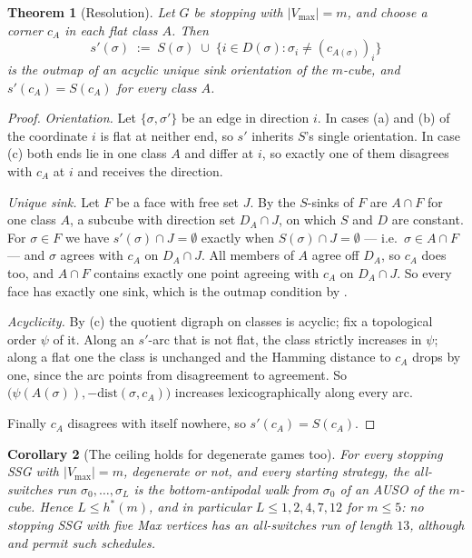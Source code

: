\documentclass[11pt]{article}
\theoremstyle{plain}
\newtheorem{theorem}{Theorem}[section]
\newtheorem{corollary}[theorem]{Corollary}
\theoremstyle{definition}
\newcommand{\Vmax}{V_{\max}}
\begin{document}
\begin{theorem}[Resolution]\label{thm:flat-resolution}
Let $G$ be stopping with $|\Vmax|=m$, and choose a corner $c_A$ in each flat
class $A$. Then
\[
  s'(\sigma)\;:=\;S(\sigma)\;\cup\;\bigl\{i\in D(\sigma):\sigma_i\ne(c_{A(\sigma)})_i\bigr\}
\]
is the outmap of an acyclic unique sink orientation of the $m$-cube, and
$s'(c_A)=S(c_A)$ for every class $A$.
\end{theorem}

\begin{proof}
\emph{Orientation.} Let $\{\sigma,\sigma'\}$ be an edge in direction $i$. In
cases (a) and (b) of  the coordinate $i$ is flat at
neither end, so $s'$ inherits $S$'s single orientation. In case (c) both ends
lie in one class $A$ and differ at $i$, so exactly one of them disagrees with
$c_A$ at $i$ and receives the direction.

\emph{Unique sink.} Let $F$ be a face with free set $J$. By
 the $S$-sinks of $F$ are $A\cap F$ for one class $A$, a
subcube with direction set $D_A\cap J$, on which $S$ and $D$ are constant.
For $\sigma\in F$ we have $s'(\sigma)\cap J=\emptyset$ exactly when
$S(\sigma)\cap J=\emptyset$ --- i.e.\ $\sigma\in A\cap F$ --- and $\sigma$
agrees with $c_A$ on $D_A\cap J$. All members of $A$ agree off $D_A$, so
$c_A$ does too, and $A\cap F$ contains exactly one point agreeing with $c_A$
on $D_A\cap J$. So every face has exactly one sink, which is the outmap
condition by .

\emph{Acyclicity.} By (c) the quotient digraph on classes
is acyclic; fix a topological order $\psi$ of it. Along an $s'$-arc that is
not flat, the class strictly increases in $\psi$; along a flat one the class
is unchanged and the Hamming distance to $c_A$ drops by one, since the arc
points from disagreement to agreement. So
$\bigl(\psi(A(\sigma)),-\mathrm{dist}(\sigma,c_A)\bigr)$ increases
lexicographically along every arc.

Finally $c_A$ disagrees with itself nowhere, so $s'(c_A)=S(c_A)$.
\end{proof}

\begin{corollary}[The ceiling holds for degenerate games too]\label{cor:ceiling-general}
For every stopping SSG with $|\Vmax|=m$, degenerate or not, and every
starting strategy, the all-switches run $\sigma_0,\dots,\sigma_L$ is the
bottom-antipodal walk from $\sigma_0$ of an AUSO of the $m$-cube. Hence
$L\le h^{\ast}(m)$, and in particular $L\le1,2,4,7,12$ for $m\le5$: no
stopping SSG with five Max vertices has an all-switches run of length $13$,
although  and  permit such schedules.
\end{corollary}
\end{document}
